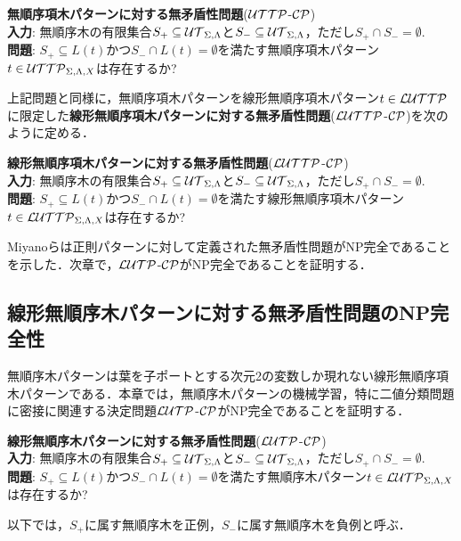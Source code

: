 \medskip
\noindent
\textbf{無順序項木パターンに対する無矛盾性問題}(${\cal UTTP}$-${\cal CP}$)\\
\textbf{入力}: 無順序木の有限集合$S_+\subseteq {\cal UT}_{\Sigma,\Lambda}$と$S_-\subseteq {\cal UT}_{\Sigma,\Lambda}$，ただし$S_+\cap S_-=\emptyset$.\\
\textbf{問題}: $S_+\subseteq L(t)$かつ$S_-\cap L(t)=\emptyset$を満たす無順序項木パターン$t\in {\cal UTTP}_{\Sigma,\Lambda,X}$は存在するか?
\medskip

上記問題と同様に，無順序項木パターンを線形無順序項木パターン$t\in {\cal LUTTP}$に限定した\textbf{線形無順序項木パターンに対する無矛盾性問題}(${\cal LUTTP}$-${\cal CP}$)を次のように定める．

\medskip
\noindent
\textbf{線形無順序項木パターンに対する無矛盾性問題}(${\cal LUTTP}$-${\cal CP}$)\\
\textbf{入力}: 無順序木の有限集合$S_+\subseteq {\cal UT}_{\Sigma,\Lambda}$と$S_-\subseteq {\cal UT}_{\Sigma,\Lambda}$，ただし$S_+\cap S_-=\emptyset$.\\
\textbf{問題}: $S_+\subseteq L(t)$かつ$S_-\cap L(t)=\emptyset$を満たす線形無順序項木パターン$t\in {\cal LUTTP}_{\Sigma,\Lambda,X}$は存在するか?
\medskip

Miyanoら\cite{miyano-ngc2000}は正則パターンに対して定義された無矛盾性問題がNP完全であることを示した．次章で，${\cal LUTP}$-${\cal CP}$がNP完全であることを証明する．

\subsection{線形無順序木パターンに対する無矛盾性問題のNP完全性}
無順序木パターンは葉を子ポートとする次元2の変数しか現れない線形無順序項木パターンである．本章では，無順序木パターンの機械学習，特に二値分類問題に密接に関連する決定問題${\cal LUTP}$-${\cal CP}$がNP完全であることを証明する．

\medskip
\noindent
\textbf{線形無順序木パターンに対する無矛盾性問題}(${\cal LUTP}$-${\cal CP}$)\\
\textbf{入力}: 無順序木の有限集合$S_+\subseteq {\cal UT}_{\Sigma,\Lambda}$と$S_-\subseteq {\cal UT}_{\Sigma,\Lambda}$，ただし$S_+\cap S_-=\emptyset$.\\
\textbf{問題}: $S_+\subseteq L(t)$かつ$S_-\cap L(t)=\emptyset$を満たす無順序木パターン$t\in {\cal LUTP}_{\Sigma,\Lambda,X}$は存在するか?

以下では，$S_+$に属す無順序木を正例，$S_-$に属す無順序木を負例と呼ぶ．





